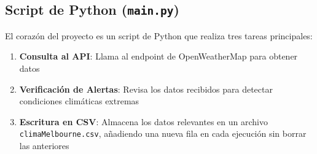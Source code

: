 \documentclass[11pt]{article}
\begin{document}
\subsection{Script de Python (\texttt{main.py})}
\label{sec:org47747b3}

El corazón del proyecto es un script de Python que realiza tres tareas principales:
\begin{enumerate}
\item \textbf{Consulta al API}: Llama al endpoint de OpenWeatherMap para obtener datos
\item \textbf{Verificación de Alertas}: Revisa los datos recibidos para detectar condiciones climáticas
extremas
\item \textbf{Escritura en CSV}: Almacena los datos relevantes en un archivo \texttt{climaMelbourne.csv},
añadiendo una nueva fila en cada ejecución sin borrar las anteriores
\end{enumerate}
\end{document}
